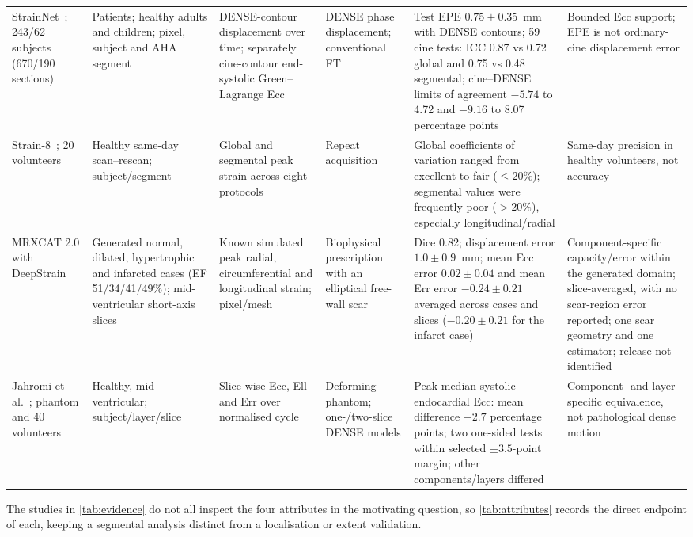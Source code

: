 {\begin{longtable}{L{0.11\textwidth}L{0.13\textwidth}L{0.14\textwidth}L{0.13\textwidth}L{0.20\textwidth}L{0.10\textwidth}}
\addlinespace
StrainNet~\cite{wang2023strainnet}; 243/62 subjects (670/190 sections) & Patients; healthy adults and children; pixel, subject and AHA segment & DENSE-contour displacement over time; separately cine-contour end-systolic Green--Lagrange Ecc & DENSE phase displacement; conventional FT & Test EPE \(0.75\pm0.35\)~mm with DENSE contours; 59 cine tests: ICC 0.87 vs 0.72 global and 0.75 vs 0.48 segmental; cine--DENSE limits of agreement \(-5.74\) to 4.72 and \(-9.16\) to 8.07 percentage points & Bounded Ecc support; EPE is not ordinary-cine displacement error \\
\addlinespace
Strain-8~\cite{bell2025strain8}; 20 volunteers & Healthy same-day scan--rescan; subject/segment & Global and segmental peak strain across eight protocols & Repeat acquisition & Global coefficients of variation ranged from excellent to fair ($\leq20\%$); segmental values were frequently poor ($>20\%$), especially longitudinal/radial & Same-day precision in healthy volunteers, not accuracy \\
\addlinespace
MRXCAT 2.0 with DeepStrain~\cite{mrxcat2023,morales2021} & Generated normal, dilated, hypertrophic and infarcted cases (EF 51/34/41/49\%); mid-ventricular short-axis slices & Known simulated peak radial, circumferential and longitudinal strain; pixel/mesh & Biophysical prescription with an elliptical free-wall scar & Dice 0.82; displacement error \(1.0\pm0.9\)~mm; mean Ecc error \(0.02\pm0.04\) and mean Err error \(-0.24\pm0.21\) averaged across cases and slices (\(-0.20\pm0.21\) for the infarct case) & Component-specific capacity/error within the generated domain; slice-averaged, with no scar-region error reported; one scar geometry and one estimator; release not identified \\
\addlinespace
Jahromi et al.~\cite{jahromi2026densecine}; phantom and 40 volunteers & Healthy, mid-ventricular; subject/layer/slice & Slice-wise Ecc, Ell and Err over normalised cycle & Deforming phantom; one-/two-slice DENSE models & Peak median systolic endocardial Ecc: mean difference \(-2.7\) percentage points; two one-sided tests within selected \(\pm3.5\)-point margin; other components/layers differed & Component- and layer-specific equivalence, not pathological dense motion \\
\bottomrule
\end{longtable}
}

The studies in \cref{tab:evidence} do not all inspect the four attributes in the motivating question, so \cref{tab:attributes} records the direct endpoint of each, keeping a segmental analysis distinct from a localisation or extent validation.

